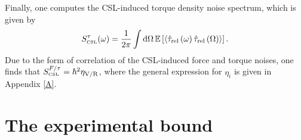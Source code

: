 \documentclass[aps,twocolumn,pra,superscriptaddress]{revtex4-2}
\newcommand\D{\operatorname{d}\!}
\begin{document}
Finally, one computes the CSL-induced torque density noise spectrum, which is given by
\begin{equation}
    S^{\tau}_\text{\tiny CSL}(\omega)=\frac{1}{2\pi}\int\D\Omega\,\mathbb{E}\left[\braket{ \hat \tau_{\text{rel}}\left(\omega\right)\hat \tau_{\text{rel}}\left(\Omega\right)}\right].
\end{equation}
Due to the form of correlation of the CSL-induced force and torque noises, one finds that $S^{F/\tau}_\text{\tiny CSL}=\hbar^2 \eta_{\mathrm{V}/\mathrm{R}}$, where the general expression for $\eta_i$ is given in Appendix \ref{A}.



\section{The experimental bound}
\end{document}
